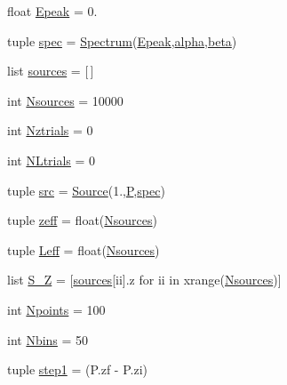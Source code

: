 \begin{DoxyCompactItemize}
\item 
float \hyperlink{namespacegrbsim__test2_a3319df3701f2ee98f3ee0f0a9321a6c6}{Epeak} = 0.
\item 
tuple \hyperlink{namespacegrbsim__test2_a078846a9103167ba7e6d6f4dd4c48d6e}{spec} = \hyperlink{classgrbsim_1_1_spectrum}{Spectrum}(\hyperlink{namespacegrbsim__test2_a3319df3701f2ee98f3ee0f0a9321a6c6}{Epeak},\hyperlink{namespacegrbsim__test2_afae8b761442f0621df6e5d2dc0952c2b}{alpha},\hyperlink{namespacegrbsim__test2_aab947809983f7713234bd51a3f89fa44}{beta})
\item 
list \hyperlink{namespacegrbsim__test2_a641d37ace029267317c8dee4d92f8073}{sources} = \mbox{[}$\,$\mbox{]}
\item 
int \hyperlink{namespacegrbsim__test2_a54ecb545b55707213e4268f70d92c8dc}{Nsources} = 10000
\item 
int \hyperlink{namespacegrbsim__test2_a114468d7823684eb193364d66b2b75dc}{Nztrials} = 0
\item 
int \hyperlink{namespacegrbsim__test2_a40b35f6e21c03593ce7f19b5b5dc56ed}{N\-Ltrials} = 0
\item 
tuple \hyperlink{namespacegrbsim__test2_a886d7b207f0901d27f23e86bdfb15ed4}{src} = \hyperlink{classgrbsim_1_1_source}{Source}(1.,\hyperlink{namespacegrbsim__test2_ac5a4085bab1950b51a1ca1f9350faff3}{P},\hyperlink{namespacegrbsim__test2_a078846a9103167ba7e6d6f4dd4c48d6e}{spec})
\item 
tuple \hyperlink{namespacegrbsim__test2_a13b835692fda0f61664fe2b3c0f326da}{zeff} = float(\hyperlink{namespacegrbsim__test2_a54ecb545b55707213e4268f70d92c8dc}{Nsources})
\item 
tuple \hyperlink{namespacegrbsim__test2_afc8457721a0b6d9402e404fafada2acb}{Leff} = float(\hyperlink{namespacegrbsim__test2_a54ecb545b55707213e4268f70d92c8dc}{Nsources})
\item 
list \hyperlink{namespacegrbsim__test2_a6f7437465e3772d7528472e0f2f47441}{S\-\_\-\-Z} = \mbox{[}\hyperlink{namespacegrbsim__test2_a641d37ace029267317c8dee4d92f8073}{sources}\mbox{[}ii\mbox{]}.z for ii in xrange(\hyperlink{namespacegrbsim__test2_a54ecb545b55707213e4268f70d92c8dc}{Nsources})\mbox{]}
\item 
int \hyperlink{namespacegrbsim__test2_a189373bc9fb066e8b9cb32bde08b6303}{Npoints} = 100
\item 
int \hyperlink{namespacegrbsim__test2_a121aab1a22022d2bb0655f8a9be95d21}{Nbins} = 50
\item 
tuple \hyperlink{namespacegrbsim__test2_ace66778df3269bdd4347faf034639aaf}{step1} = (P.\-zf -\/ P.\-zi)

\end{DoxyCompactItemize}
